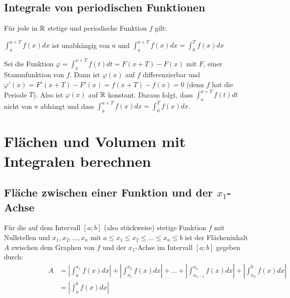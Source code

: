 \documentclass[main.tex]{subfiles}
\begin{document}
\subsection{Integrale von periodischen Funktionen}

\begin{Theorem}
  Für jede in $\mathbb{R}$ stetige und periodische Funktion $f$ gilt:
  \begin{center}
  \( \displaystyle\int_a^{a+T} f(x)dx\) ist unabhängig von $a$ und \( \displaystyle\int_a^{a+T} f(x)dx = \int_0^{T} f(x)dx\)
  \end{center}
\end{Theorem}

\begin{Beweis}
  Sei die Funktion $\varphi = \displaystyle{\int_x^{x+T} f(t)dt}=F(x+T)-F(x)$ mit $F$, einer Stammfunktion von $f$. Dann ist
  $\varphi(x)$ auf $f$ differenzierbar und $\varphi'(x)=F'(x+T)-F'(x) = f(x+T)-f(x)=0$ (denn $f$ hat die Periode $T$). Also ist $\varphi(x)$ auf $\mathbb{R}$ konstant. Daraus folgt, dass $\displaystyle{\int_a^{a+T}f(t)dt}$ nicht von $a$ abhängt und dass $\displaystyle{\int_a^{a+T} f(x)dx = \int_0^{T} f(x)dx}$.
\end{Beweis}



\section{Flächen und Volumen mit Integralen berechnen}

\subsection{Fläche zwischen einer Funktion und der $x_1$-Achse}

\begin{Definition}
  Für die auf dem Intervall $[a;b]$ (also stückweise) stetige Funktion $f$ mit Nullstellen und $x_1,x_2,...,x_n$
  mit $a \leq x_1 \leq x_2 \leq ... \leq x_n \leq b$ ist der Flächeninhalt $A$ zwischen dem Graphen von $f$ und
  der $x_1$-Achse im Intervall $[a;b]$ gegeben durch:
  \begin{align*}
    \qquad\qquad\qquad A &= \left|{\int_a^{x_1} f(x)dx}\right|+\left|{\int_{x_1}^{x_2} f(x)dx}\right|+...+\left|{\int_{x_{n-1}}^{x_n} f(x)dx}\right|+\left|{\int_{x_n}^b f(x)dx}\right|\\
    &= \left|{\int_a^{b} f(x)dx}\right|
  \end{align*}
\end{Definition}
\end{document}
